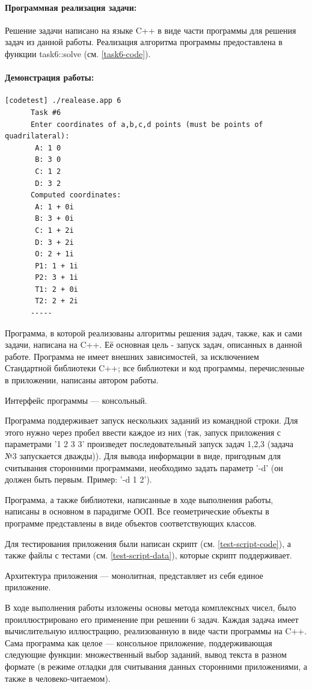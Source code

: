 {   \paragraph{Программная реализация задачи:} Решение задачи написано на языке C++ в виде части
   программы для решения задач из данной работы.
   Реализация алгоритма программы предоставлена в функции task6::solve (см. \ref{task6-code}).
   \paragraph{Демонстрация работы:}
   \vphantom{code}
   \begin{lstlisting}[language={},frame=none]
      [codetest] ./realease.app 6
      Task #6
      Enter coordinates of a,b,c,d points (must be points of quadrilateral):
       A: 1 0
       B: 3 0
       C: 1 2
       D: 3 2
      Computed coordinates:
       A: 1 + 0i
       B: 3 + 0i
       C: 1 + 2i
       D: 3 + 2i
       O: 2 + 1i
       P1: 1 + 1i
       P2: 3 + 1i
       T1: 2 + 0i
       T2: 2 + 2i
      -----
   \end{lstlisting}
}
{
   Программа, в которой реализованы алгоритмы решения задач, также, как и сами задачи, написана на C++. Её основная цель - запуск задач, описанных в данной работе. Программа не имеет внешних зависимостей, за исключением Стандартной библиотеки C++; все библиотеки и код программы, перечисленные в приложении, написаны автором работы.

   Интерфейс программы --- консольный.

   Программа поддерживает запуск нескольких заданий из командной строки. Для этого нужно через
   пробел ввести каждое из них (так, запуск приложения с параметрами '1 2 3 3' произведет
   последовательный запуск задач 1,2,3 (задача №3 запускается дважды)). Для вывода информации
   в виде, пригодным для считывания сторонними программами, необходимо задать параметр '-d'
   (он должен быть первым. Пример: '-d 1 2').

   Программа, а также библиотеки, написанные в ходе выполнения работы, написаны в основном в парадигме ООП. Все геометрические объекты в программе представлены в виде объектов соответствующих классов.

   Для тестирования приложения были написан скрипт (см. \ref{test-script-code}), а также файлы с тестами (см. \ref{test-script-data}), которые скрипт поддерживает.
   
   Архитектура приложения --- монолитная, представляет из себя единое приложение.
}
В ходе выполнения работы изложены основы метода комплексных чисел, было проиллюстрировано его
применение при решении 6 задач. Каждая задача имеет вычислительную иллюстрацию,
реализованную в виде части программы на C++. Сама программа как целое --- консольное приложение,
поддерживающая следующие функции: множественный выбор заданий, вывод текста в разном формате (в режиме
отладки для считывания данных сторонними приложениями, а также в человеко-читаемом).

